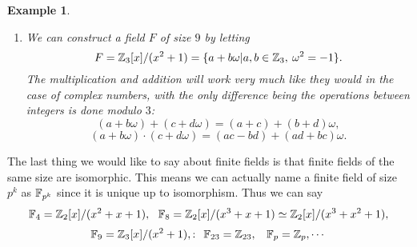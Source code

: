 \documentclass[12pt]{article}
\theoremstyle{plain}
\newtheorem{example}{Example}
\theoremstyle{definition}
\theoremstyle{remark}
\begin{document}
\begin{example}
\begin{enumerate}
\begin{table}[H]
{\begin{tabular}{ c| c | c |c|c|c|c|c|c}
\end{tabular}
}
\end{table}


\begin{table}[H]
\footnotesize{
\begin{tabular}{ c| c | c |c|c|c|c|c|c}
$\cdot$  & $0$ & $1$ & $\omega$ & $\omega^2$ & $1+\omega$ & $1+\omega^2$ & $\omega+\omega^2$ & $1+\omega+\omega^2$ \\
\hline
$0$ &$0$ & $0$ & $0$ & $0$ & $0$ & $0$ & $0$ & $0$   \\
\hline
$1$ & $0$ & $1$ & $\omega$ & $\omega^2$ & $1+\omega$ & $1+\omega^2$ & $\omega+\omega^2$ & $1+\omega+\omega^2$ \\
\hline
$\omega$ & $0$ & $\omega$ & $\omega^2$ & $1+\omega$  & $\omega+\omega^2$ & $1$ & $1+\omega+\omega^2$ & $1+\omega^2$\\ \hline
$\omega^2$ & $0$ & $\omega^2$ & $1+\omega$&$\omega+\omega^2$ & $1+\omega+\omega^2$ &$\omega$& $1+\omega^2$ & $1$\\
\hline
$1+\omega$ & $0$& $1+\omega$ & $\omega+\omega^2$&$1+\omega+\omega^2$ & $1+\omega^2$ &$\omega^2$& $1$ & $\omega$\\
\hline
$1+\omega^2$ & $0$& $1+\omega^2$&$1$ & $\omega$&$\omega^2$ &$1+\omega+\omega^2$& $1+\omega$ & $\omega+\omega^2$\\
\hline
$\omega+\omega^2$ & $0$&$\omega+\omega^2$& $1+\omega+\omega^2$&$1+\omega^2$ & $1$&$1+\omega$ &$\omega$& $\omega^2$\\
\hline
$1+\omega+\omega^2$ & $0$&$1+\omega+\omega^2$& $1+\omega^2$&$1$ & $\omega$&$\omega+\omega^2$ &$\omega^2$& $1+\omega$\\
\end{tabular}
}
\end{table}

\item We can construct a field $F$ of size $9$ by letting
$$F = \mathbb{Z}_3[x]/(x^2+1) = \{a+b\omega|a, b\in \mathbb{Z}_3, \:\omega^2=-1\}.$$
The multiplication and addition will work very much like they would in the case of complex numbers, with the only difference being the operations between integers is done modulo $3$:
$$(a+b\omega)+(c+d\omega) = (a+c)+(b+d)\omega,$$
$$(a+b\omega)\cdot(c+d\omega)=(ac-bd)+(ad+bc)\omega.$$
\end{enumerate}
\end{example}
The last thing we would like to say about finite fields is that finite fields of the same size are isomorphic. This means we can actually name a finite field of size $p^k$ as $\mathbb{F}_{p^k}$ since it is unique up to isomorphism.
Thus we can say
$$\mathbb{F}_4 = \mathbb{Z}_2[x]/(x^2+x+1), \:\:\: \mathbb{F}_8 = \mathbb{Z}_2[x]/(x^3+x+1) \simeq \mathbb{Z}_2[x]/(x^3+x^2+1),$$
$$\mathbb{F}_9 = \mathbb{Z}_3[x]/(x^2+1),:\:\: \mathbb{F}_{23}=\mathbb{Z}_{23}, \:\:\:\: \mathbb{F}_p=\mathbb{Z}_p, \cdots $$
\end{document}
